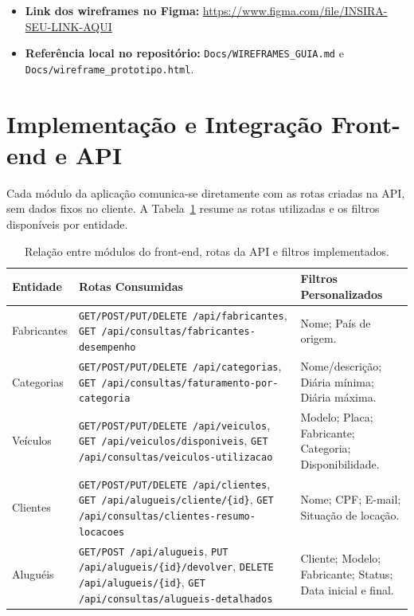 \documentclass[12pt]{article}
\begin{document}
\begin{itemize}
  \item \textbf{Link dos wireframes no Figma:} \url{https://www.figma.com/file/INSIRA-SEU-LINK-AQUI}
  \item \textbf{Referência local no repositório:} \texttt{Docs/WIREFRAMES\_GUIA.md} e \texttt{Docs/wireframe\_prototipo.html}.
\end{itemize}

\section{Implementação e Integração Front-end e API}

Cada módulo da aplicação comunica-se diretamente com as rotas criadas na API, sem dados fixos no cliente. A Tabela~\ref{tab:rotas} resume as rotas utilizadas e os filtros disponíveis por entidade.

\begin{table}[ht]
\centering
\caption{Relação entre módulos do front-end, rotas da API e filtros implementados.}
\label{tab:rotas}
\scriptsize
\begin{tabular}{@{}p{2.3cm}p{5.5cm}p{5.5cm}@{}}
\toprule
\textbf{Entidade} & \textbf{Rotas Consumidas} & \textbf{Filtros Personalizados} \\
\midrule
Fabricantes & \texttt{GET/POST/PUT/DELETE /api/fabricantes}, \texttt{GET /api/consultas/fabricantes-desempenho} & Nome; País de origem. \\
Categorias & \texttt{GET/POST/PUT/DELETE /api/categorias}, \texttt{GET /api/consultas/faturamento-por-categoria} & Nome/descrição; Diária mínima; Diária máxima. \\
Veículos & \texttt{GET/POST/PUT/DELETE /api/veiculos}, \texttt{GET /api/veiculos/disponiveis}, \texttt{GET /api/consultas/veiculos-utilizacao} & Modelo; Placa; Fabricante; Categoria; Disponibilidade. \\
Clientes & \texttt{GET/POST/PUT/DELETE /api/clientes}, \texttt{GET /api/alugueis/cliente/\{id\}}, \texttt{GET /api/consultas/clientes-resumo-locacoes} & Nome; CPF; E-mail; Situação de locação. \\
Aluguéis & \texttt{GET/POST /api/alugueis}, \texttt{PUT /api/alugueis/\{id\}/devolver}, \texttt{DELETE /api/alugueis/\{id\}}, \texttt{GET /api/consultas/alugueis-detalhados} & Cliente; Modelo; Fabricante; Status; Data inicial e final. \\
\bottomrule
\end{tabular}
\end{table}
\end{document}
